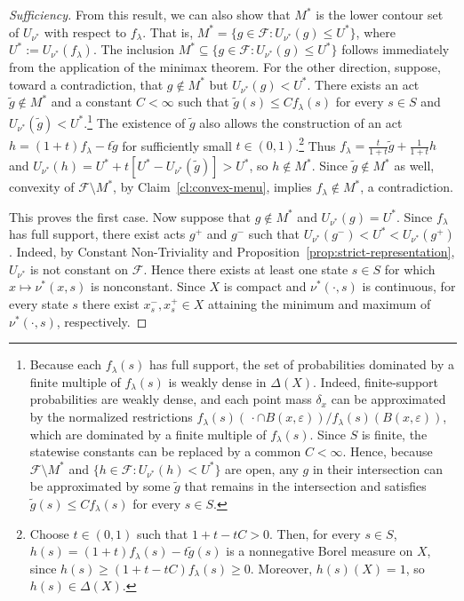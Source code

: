 \documentclass[11pt]{article}
\begin{document}
\begin{proof}[Sufficiency]
From this result, we can also show that $M^*$ is the lower contour set
of $U_{\nu^*}$ with respect to $f_\lambda$. That is,
$M^*=\{g\in\mathcal{F}:U_{\nu^*}(g)\leq U^*\}$, where
$U^*:=U_{\nu^*}(f_\lambda)$. The inclusion
$M^*\subseteq\{g\in\mathcal{F}:U_{\nu^*}(g)\leq U^*\}$ follows
immediately from the application of the minimax theorem. For the other
direction, suppose, toward a contradiction, that $g\notin M^*$ but
$U_{\nu^*}(g)<U^*$. There exists an act $\tilde g\notin M^*$ and
a constant $C<\infty$ such that $\tilde g(s)\leq C f_\lambda(s)$ for
every $s\in S$ and $U_{\nu^*}(\tilde g)<U^*$.\footnote{Because each
$f_\lambda(s)$ has full support, the set of probabilities dominated by
a finite multiple of $f_\lambda(s)$ is weakly dense in $\Delta(X)$.
Indeed, finite-support probabilities are weakly dense, and each point
mass $\delta_x$ can be approximated by the normalized restrictions
$f_\lambda(s)(\,\cdot\cap B(x,\varepsilon))/
f_\lambda(s)(B(x,\varepsilon))$, which are dominated by a finite
multiple of $f_\lambda(s)$. Since $S$ is finite, the statewise constants
can be replaced by a common $C<\infty$. Hence, because
$\mathcal{F}\setminus M^*$ and
$\{h\in\mathcal{F}:U_{\nu^*}(h)<U^*\}$ are open, any $g$ in their intersection
can be approximated by some $\tilde g$ that remains in the intersection
and satisfies $\tilde g(s)\leq C f_\lambda(s)$ for every $s\in S$.}
The existence of $\tilde g$ also allows the construction of an act
$h=(1+t)f_\lambda-t\tilde g$ for sufficiently small
$t\in(0,1)$.\footnote{Choose $t\in(0,1)$ such that
$1+t-tC>0$. Then, for every $s\in S$,
$h(s)=(1+t)f_\lambda(s)-t\tilde g(s)$ is a nonnegative Borel measure
on $X$, since $h(s)\geq(1+t-tC)f_\lambda(s)\geq0$.
Moreover, $h(s)(X)=1$, so $h(s)\in\Delta(X)$.}
Thus $f_\lambda=\frac{t}{1+t}\tilde g+\frac{1}{1+t}h$ and
$U_{\nu^*}(h)=U^*+t[U^*-U_{\nu^*}(\tilde g)]>U^*$, so
$h\notin M^*$. Since $\tilde g\notin M^*$ as well, convexity of
$\mathcal{F}\setminus M^*$, by Claim~\ref{cl:convex-menu}, implies
$f_\lambda\notin M^*$, a contradiction.

This proves the first case. Now suppose that $g\notin M^*$ and
$U_{\nu^*}(g)=U^*$. Since $f_\lambda$ has full support, there exist
acts $g^+$ and $g^-$ such that
$U_{\nu^*}(g^-)<U^*<U_{\nu^*}(g^+)$. Indeed, by Constant
Non-Triviality and Proposition~\ref{prop:strict-representation},
$U_{\nu^*}$ is not constant on $\mathcal{F}$. Hence there exists
at least one state $s\in S$ for which $x\mapsto\nu^*(x,s)$ is
nonconstant. Since $X$ is compact and $\nu^*(\cdot,s)$ is continuous,
for every state $s$ there exist $x_s^-,x_s^+\in X$ attaining the minimum
and maximum of $\nu^*(\cdot,s)$, respectively.


\end{proof}
\end{document}
